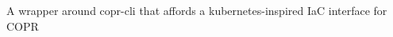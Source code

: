 \begin{project}

  \begin{projectdescription}
    A wrapper around copr-cli that affords a kubernetes-inspired IaC interface for COPR
  \end{projectdescription}
\end{project}
